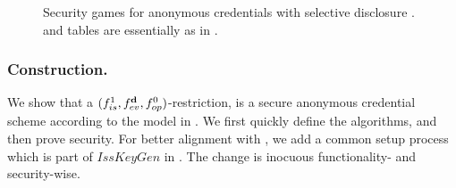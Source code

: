 \begin{figure}[ht!]
  \centering
  \caption{Security games for anonymous credentials with selective disclosure
    \cite{fhs19}. \OWNR and \ATTR tables are essentially as in
    .}
  \label{fig:model-ac}  
\end{figure}

\subsubsection{\CUASAC Construction.} %
We show that a $(f_{is}^1,f_{ev}^{\mathbf{d}},f_{op}^0)$-\CUASGen restriction, is
a secure anonymous credential scheme according to the model in \cite{fhs19}. We
first quickly define the algorithms, and then prove security. For better
alignment with \UAS, we add a common setup process which is part of $IssKeyGen$
in \cite{fhs19}. The change is inocuous functionality- and security-wise.


